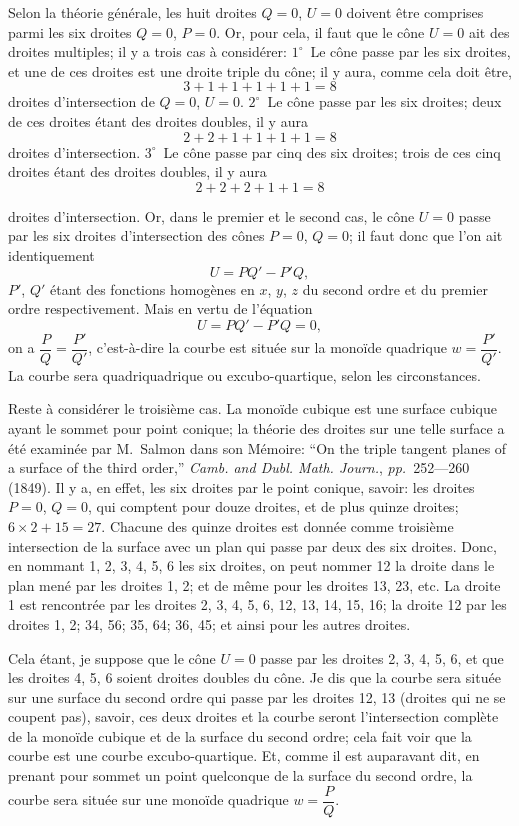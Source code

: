\documentclass[11pt,a4paper]{article}
\newcommand{\pages}{\textit{pp.}}
\begin{document}
Selon la th\'{e}orie g\'{e}n\'{e}rale, les huit droites $Q = 0$, $U = 0$ doivent \^{e}tre comprises parmi les six droites $Q = 0$, $P = 0$. Or, pour cela, il faut que le c\^{o}ne $U = 0$ ait des droites multiples; il y a trois cas \`{a} consid\'{e}rer: $1^\circ$~Le c\^{o}ne passe par les six droites, et une de ces droites est une droite triple du c\^{o}ne; il y aura, comme cela doit \^{e}tre,
\[
3 + 1 + 1 + 1 + 1 + 1 = 8
\]
droites d'intersection de $Q = 0$, $U = 0$. $2^\circ$~Le c\^{o}ne passe par les six droites; deux de ces droites \'{e}tant des droites doubles, il y aura
\[
2 + 2 + 1 + 1 + 1 + 1 = 8
\]
droites d'intersection. $3^\circ$~Le c\^{o}ne passe par cinq des six droites; trois de ces cinq droites \'{e}tant des droites doubles, il y aura
\[
2 + 2 + 2 + 1 + 1 = 8
\]

\clearpage

droites d'intersection. Or, dans le premier et le second cas, le c\^{o}ne $U = 0$ passe par les six droites d'intersection des c\^{o}nes $P = 0$, $Q = 0$; il faut donc que l'on ait identiquement
\[
U = PQ' - P'Q,
\]
$P'$, $Q'$ \'{e}tant des fonctions homog\`{e}nes en $x$, $y$, $z$ du second ordre et du premier ordre respectivement. Mais en vertu de l'\'{e}quation
\[
U = PQ' - P'Q = 0,
\]
on a $\dfrac{P}{Q} = \dfrac{P'}{Q'}$, c'est-\`{a}-dire la courbe est situ\'{e}e sur la mono\"{i}de quadrique $w = \dfrac{P'}{Q'}$. La courbe sera quadriquadrique ou excubo-quartique, selon les circonstances.

Reste \`{a} consid\'{e}rer le troisi\`{e}me cas. La mono\"{i}de cubique est une surface cubique ayant le sommet pour point conique; la th\'{e}orie des droites sur une telle surface a \'{e}t\'{e} examin\'{e}e par M.~Salmon dans son M\'{e}moire: ``On the triple tangent planes of a surface of the third order,'' \textit{Camb. and Dubl. Math. Journ.}, \pages~252---260 (1849). Il y a, en effet, les six droites par le point conique, savoir: les droites $P = 0$, $Q = 0$, qui comptent pour douze droites, et de plus quinze droites; $6 \times 2 + 15 = 27$. Chacune des quinze droites est donn\'{e}e comme troisi\`{e}me intersection de la surface avec un plan qui passe par deux des six droites. Donc, en nommant 1, 2, 3, 4, 5, 6 les six droites, on peut nommer 12 la droite dans le plan men\'{e} par les droites 1, 2; et de m\^{e}me pour les droites 13, 23, etc. La droite 1 est rencontr\'{e}e par les droites 2, 3, 4, 5, 6, 12, 13, 14, 15, 16; la droite 12 par les droites 1, 2; 34, 56; 35, 64; 36, 45; et ainsi pour les autres droites.

Cela \'{e}tant, je suppose que le c\^{o}ne $U = 0$ passe par les droites 2, 3, 4, 5, 6, et que les droites 4, 5, 6 soient droites doubles du c\^{o}ne. Je dis que la courbe sera situ\'{e}e sur une surface du second ordre qui passe par les droites 12, 13 (droites qui ne se coupent pas), savoir, ces deux droites et la courbe seront l'intersection compl\`{e}te de la mono\"{i}de cubique et de la surface du second ordre; cela fait voir que la courbe est une courbe excubo-quartique. Et, comme il est auparavant dit, en prenant pour sommet un point quelconque de la surface du second ordre, la courbe sera situ\'{e}e sur une mono\"{i}de quadrique $w = \dfrac{P}{Q}$.
\end{document}

